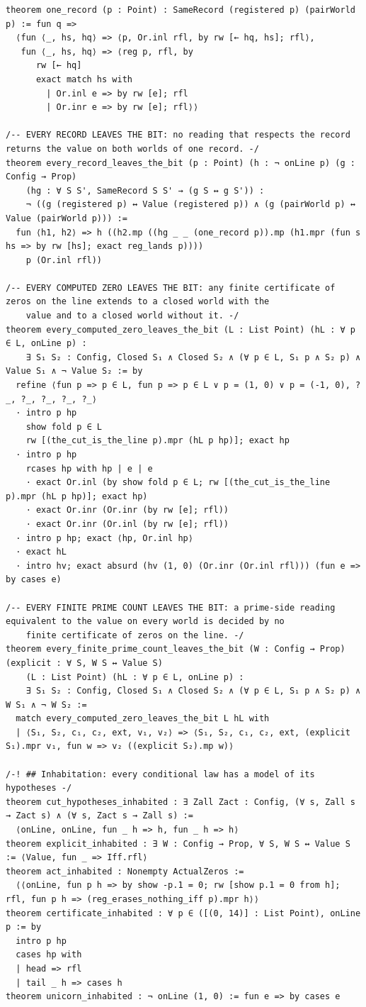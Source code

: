 \documentclass[10pt,twocolumn]{article}
\begin{document}
\begin{Verbatim}
theorem one_record (p : Point) : SameRecord (registered p) (pairWorld p) := fun q =>
  ⟨fun ⟨_, hs, hq⟩ => ⟨p, Or.inl rfl, by rw [← hq, hs]; rfl⟩,
   fun ⟨_, hs, hq⟩ => ⟨reg p, rfl, by
      rw [← hq]
      exact match hs with
        | Or.inl e => by rw [e]; rfl
        | Or.inr e => by rw [e]; rfl⟩⟩

/-- EVERY RECORD LEAVES THE BIT: no reading that respects the record returns the value on both worlds of one record. -/
theorem every_record_leaves_the_bit (p : Point) (h : ¬ onLine p) (g : Config → Prop)
    (hg : ∀ S S', SameRecord S S' → (g S ↔ g S')) :
    ¬ ((g (registered p) ↔ Value (registered p)) ∧ (g (pairWorld p) ↔ Value (pairWorld p))) :=
  fun ⟨h1, h2⟩ => h ((h2.mp ((hg _ _ (one_record p)).mp (h1.mpr (fun s hs => by rw [hs]; exact reg_lands p))))
    p (Or.inl rfl))

/-- EVERY COMPUTED ZERO LEAVES THE BIT: any finite certificate of zeros on the line extends to a closed world with the
    value and to a closed world without it. -/
theorem every_computed_zero_leaves_the_bit (L : List Point) (hL : ∀ p ∈ L, onLine p) :
    ∃ S₁ S₂ : Config, Closed S₁ ∧ Closed S₂ ∧ (∀ p ∈ L, S₁ p ∧ S₂ p) ∧ Value S₁ ∧ ¬ Value S₂ := by
  refine ⟨fun p => p ∈ L, fun p => p ∈ L ∨ p = (1, 0) ∨ p = (-1, 0), ?_, ?_, ?_, ?_, ?_⟩
  · intro p hp
    show fold p ∈ L
    rw [(the_cut_is_the_line p).mpr (hL p hp)]; exact hp
  · intro p hp
    rcases hp with hp | e | e
    · exact Or.inl (by show fold p ∈ L; rw [(the_cut_is_the_line p).mpr (hL p hp)]; exact hp)
    · exact Or.inr (Or.inr (by rw [e]; rfl))
    · exact Or.inr (Or.inl (by rw [e]; rfl))
  · intro p hp; exact ⟨hp, Or.inl hp⟩
  · exact hL
  · intro hv; exact absurd (hv (1, 0) (Or.inr (Or.inl rfl))) (fun e => by cases e)

/-- EVERY FINITE PRIME COUNT LEAVES THE BIT: a prime-side reading equivalent to the value on every world is decided by no
    finite certificate of zeros on the line. -/
theorem every_finite_prime_count_leaves_the_bit (W : Config → Prop) (explicit : ∀ S, W S ↔ Value S)
    (L : List Point) (hL : ∀ p ∈ L, onLine p) :
    ∃ S₁ S₂ : Config, Closed S₁ ∧ Closed S₂ ∧ (∀ p ∈ L, S₁ p ∧ S₂ p) ∧ W S₁ ∧ ¬ W S₂ :=
  match every_computed_zero_leaves_the_bit L hL with
  | ⟨S₁, S₂, c₁, c₂, ext, v₁, v₂⟩ => ⟨S₁, S₂, c₁, c₂, ext, (explicit S₁).mpr v₁, fun w => v₂ ((explicit S₂).mp w)⟩

/-! ## Inhabitation: every conditional law has a model of its hypotheses -/
theorem cut_hypotheses_inhabited : ∃ Zall Zact : Config, (∀ s, Zall s → Zact s) ∧ (∀ s, Zact s → Zall s) :=
  ⟨onLine, onLine, fun _ h => h, fun _ h => h⟩
theorem explicit_inhabited : ∃ W : Config → Prop, ∀ S, W S ↔ Value S := ⟨Value, fun _ => Iff.rfl⟩
theorem act_inhabited : Nonempty ActualZeros :=
  ⟨⟨onLine, fun p h => by show -p.1 = 0; rw [show p.1 = 0 from h]; rfl, fun p h => (reg_erases_nothing_iff p).mpr h⟩⟩
theorem certificate_inhabited : ∀ p ∈ ([(0, 14)] : List Point), onLine p := by
  intro p hp
  cases hp with
  | head => rfl
  | tail _ h => cases h
theorem unicorn_inhabited : ¬ onLine (1, 0) := fun e => by cases e


\end{Verbatim}
\end{document}
